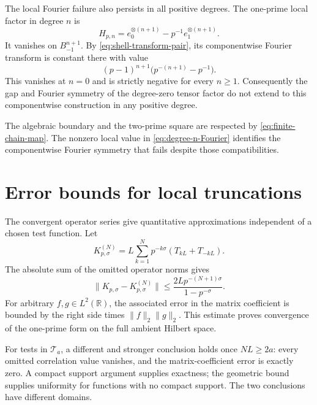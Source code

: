 \documentclass[11pt,letterpaper]{article}
\theoremstyle{definition}
\theoremstyle{remark}
\newcommand{\R}{\mathbb R}
\newcommand{\T}{\mathcal T}
\begin{document}
The local Fourier failure also persists in all
positive degrees. The one-prime local factor in degree
$n$ is
\begin{equation}\label{eq:degree-n-factor}
 H_{p,n}=e_0^{\otimes(n+1)}-p^{-1}e_1^{\otimes(n+1)}.
\end{equation}
It vanishes on $B_{-1}^{n+1}$. By
\eqref{eq:shell-transform-pair}, its componentwise
Fourier transform is constant there with value
\begin{equation}\label{eq:degree-n-Fourier}
 (p-1)^{n+1}\bigl(p^{-(n+1)}-p^{-1}\bigr).
\end{equation}
This vanishes at $n=0$ and is strictly negative for
every $n\ge1$. Consequently the gap and Fourier
symmetry of the degree-zero tensor factor do not
extend to this componentwise construction in any
positive degree.

The algebraic boundary and the two-prime square are
respected by \eqref{eq:finite-chain-map}. The nonzero
local value in \eqref{eq:degree-n-Fourier} identifies
the componentwise Fourier symmetry that fails despite
those compatibilities.

\section{Error bounds for local truncations}

The convergent operator series give quantitative
approximations independent of a chosen test function.
Let
\begin{equation}\label{eq:KN}
 K_{p,\sigma}^{(N)}
   =L\sum_{k=1}^Np^{-k\sigma}(T_{kL}+T_{-kL}).
\end{equation}
The absolute sum of the omitted operator norms gives
\begin{equation}\label{eq:K-tail}
 \|K_{p,\sigma}-K_{p,\sigma}^{(N)}\|
       \le\frac{2Lp^{-(N+1)\sigma}}{1-p^{-\sigma}}.
\end{equation}
For arbitrary $f,g\in L^2(\R)$, the associated error in
the matrix coefficient is bounded by the right side
times $\|f\|_2\|g\|_2$. This estimate proves convergence
of the one-prime form on the full ambient Hilbert space.

For tests in $\T_a$, a different and stronger conclusion
holds once $NL\ge2a$: every omitted correlation value
vanishes, and the matrix-coefficient error is exactly
zero. A compact support argument supplies exactness;
the geometric bound supplies uniformity for functions
with no compact support. The two conclusions have
different domains.
\end{document}
